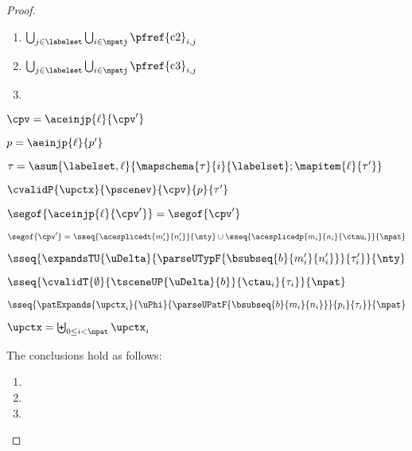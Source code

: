 \begin{grayparbox}
\begin{proof}
\begin{byCases}
\begin{enumerate}
      \item $\bigcup_{j \in \labelset} \bigcup_{i \in \npatj} \text{\pfref{c2}}_{i,j}$
      \item $\bigcup_{j \in \labelset} \bigcup_{i \in \npatj} \text{\pfref{c3}}_{i,j}$
      \item {}
    \end{enumerate}
    \resetpfcounter
  \item[\text{(\ref{rule:cvalidP-UP-in})}]
    \begin{pfsteps*}
      \item $\cpv=\aceinjp{\ell}{\cpv'}$ 
      \item $p=\aeinjp{\ell}{p'}$ 
      \item $\tau=\asum{\labelset, \ell}{\mapschema{\tau}{i}{\labelset}; \mapitem{\ell}{\tau'}}$ 
      \item $\cvalidP{\upctx}{\pscenev}{\cpv}{p}{\tau'}$  
      \item $\segof{\aceinjp{\ell}{\cpv'}} = \segof{\cpv'}$  
      \item $\segof{\cpv'} = \sseq{\acesplicedt{m'_i}{n'_i}}{\nty} \cup \sseq{\acesplicedp{m_i}{n_i}{\ctau_i}}{\npat}$  
      \item $\sseq{
            \expandsTU{\uDelta}
            {
              \parseUTypF{\bsubseq{b}{m'_i}{n'_i}}
            }{\tau'_i}
          }{\nty}$  
      \item $\sseq{
        \cvalidT{\emptyset}{
          \tsceneUP
            {\uDelta}{b}
        }{
          \ctau_i
        }{\tau_i}
      }{\npat}$  
      \item $\sseq{
        \patExpands
          {\upctx_i}
          {\uPhi}
          {\parseUPatF{\bsubseq{b}{m_i}{n_i}}}
          {p_i}
          {\tau_i}
      }{\npat}$  
    \item $\upctx = \biguplus_{0 \leq i < \npat} \upctx_i$ \end{pfsteps*}
    The conclusions hold as follows:
    \begin{enumerate}
    \item {}
    \item {}
    \item {}

\end{enumerate}
\end{byCases}
\end{proof}
\end{grayparbox}
